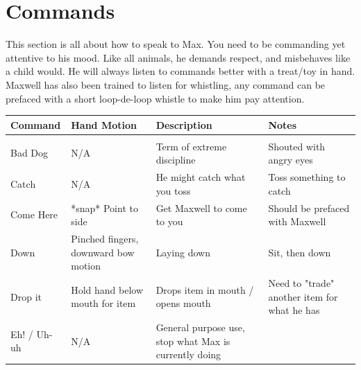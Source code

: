 \documentclass[pdftex,12pt]{article}
\begin{document}
\newpage
\section{Commands}

This section is all about how to speak to Max. You need to be commanding yet
attentive to his mood. Like all animals, he demands respect, and misbehaves like
a child would. He will always listen to commands better with a treat/toy in
hand. Maxwell has also been trained to listen for whistling, any command can be
prefaced with a short loop-de-loop whistle to make him pay attention.

\begin{table}[H]
    \label{tab:commands}
    \begin{adjustwidth}{-4.5cm}{-4.5cm}
        \begin{center}
            \bgroup
            \def\arraystretch{1.3} %
            \begin{tabular}{lp{}p{}p{}}
                Command     & Hand Motion                                      &
                Description                                           & Notes
                \\ \hline \\
                Bad Dog     & N/A                                              & Term of extreme discipline                            & Shouted with angry eyes                                            \\
                Catch       & N/A                                              & He might catch what you toss                          & Toss something to catch                                            \\
                Come Here   & *snap* Point to side                             & Get Maxwell to come to you                            & Should be prefaced with Maxwell                                    \\
                Down        & Pinched fingers, downward bow motion             & Laying down                                           & Sit, then down                                                     \\
                Drop it     & Hold hand below mouth for item                   & Drops item in mouth / opens mouth                     & Need to "trade" another item for what he has                       \\
                Eh! / Uh-uh & N/A                                              & General purpose use, stop what Max is currently doing &                                                                    \\

\end{tabular}
\end{center}
\end{adjustwidth}
\end{table}
\end{document}
